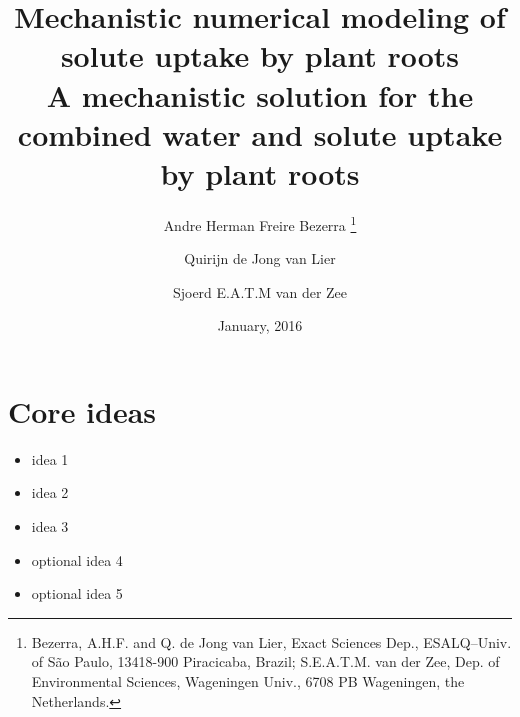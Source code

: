 \documentclass[10pt,a4paper,titlepage]{article}
\title{Mechanistic numerical modeling of solute uptake by plant roots \\ A mechanistic solution for the combined water and solute uptake by plant roots}
\date{January, 2016}
\author{Andre Herman Freire Bezerra
  \thanks{
  Bezerra, A.H.F. and Q. de Jong van Lier, Exact Sciences Dep., ESALQ--Univ. of S\~ao Paulo, 13418-900 Piracicaba, Brazil;
  S.E.A.T.M. van der Zee, Dep. of Environmental Sciences, Wageningen Univ., 6708 PB Wageningen, the Netherlands.
  }
\and Quirijn de Jong van Lier \and Sjoerd E.A.T.M van der Zee}
\begin{document}
\linenumbers
\maketitle

\section*{Core ideas}
\begin{itemize}
  \item idea 1
  \item idea 2
  \item idea 3
  \item optional idea 4
  \item optional idea 5
\end{itemize}












 
\pagebreak

\end{document}
